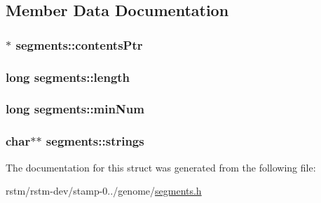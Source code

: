 \subsection{Member Data Documentation}
\hypertarget{structsegments_a62151c7ef854eed9610a05ce26b5acb6}{
\subsubsection[{contents\-Ptr}]{$\ast$ segments\-::contents\-Ptr}}\label{structsegments_a62151c7ef854eed9610a05ce26b5acb6}
\hypertarget{structsegments_a93e128ff86f2537af043229cb7826645}{
\subsubsection[{length}]{\setlength{\rightskip}{0pt plus 5cm}long segments\-::length}}\label{structsegments_a93e128ff86f2537af043229cb7826645}
\hypertarget{structsegments_ab80a6eaf14782abccf02fa0fa13cc02b}{
\subsubsection[{min\-Num}]{\setlength{\rightskip}{0pt plus 5cm}long segments\-::min\-Num}}\label{structsegments_ab80a6eaf14782abccf02fa0fa13cc02b}
\hypertarget{structsegments_a723cadd4d1893965a09d9ec08baa04ba}{
\subsubsection[{strings}]{\setlength{\rightskip}{0pt plus 5cm}char$\ast$$\ast$ segments\-::strings}}\label{structsegments_a723cadd4d1893965a09d9ec08baa04ba}


The documentation for this struct was generated from the following file\-:\begin{DoxyCompactItemize}
\item 
rstm/rstm-\/dev/stamp-\/0../genome/\hyperlink{segments_8h}{segments.\-h}\end{DoxyCompactItemize}
